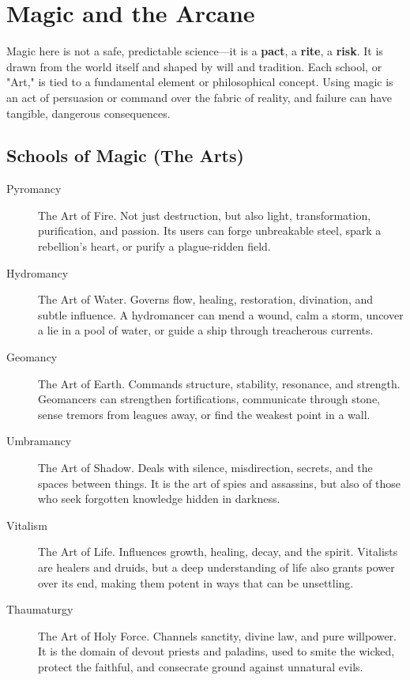 \section*{Magic and the Arcane}

Magic here is not a safe, predictable science---it is a \textbf{pact}, a \textbf{rite}, a \textbf{risk}. It is drawn from the world itself and shaped by will and tradition. Each school, or "Art," is tied to a fundamental element or philosophical concept. Using magic is an act of persuasion or command over the fabric of reality, and failure can have tangible, dangerous consequences.

\subsection*{Schools of Magic (The Arts)}

\begin{tcolorbox}[title=The Six Arts, colback=purple!5!white, colframe=purple!75!black, fonttitle=\bfseries]
\begin{description}
    \item[Pyromancy] The Art of Fire. Not just destruction, but also light, transformation, purification, and passion. Its users can forge unbreakable steel, spark a rebellion's heart, or purify a plague-ridden field.
    \item[Hydromancy] The Art of Water. Governs flow, healing, restoration, divination, and subtle influence. A hydromancer can mend a wound, calm a storm, uncover a lie in a pool of water, or guide a ship through treacherous currents.
    \item[Geomancy] The Art of Earth. Commands structure, stability, resonance, and strength. Geomancers can strengthen fortifications, communicate through stone, sense tremors from leagues away, or find the weakest point in a wall.
    \item[Umbramancy] The Art of Shadow. Deals with silence, misdirection, secrets, and the spaces between things. It is the art of spies and assassins, but also of those who seek forgotten knowledge hidden in darkness.
    \item[Vitalism] The Art of Life. Influences growth, healing, decay, and the spirit. Vitalists are healers and druids, but a deep understanding of life also grants power over its end, making them potent in ways that can be unsettling.
    \item[Thaumaturgy] The Art of Holy Force. Channels sanctity, divine law, and pure willpower. It is the domain of devout priests and paladins, used to smite the wicked, protect the faithful, and consecrate ground against unnatural evils.
\end{description}
\end{tcolorbox}

